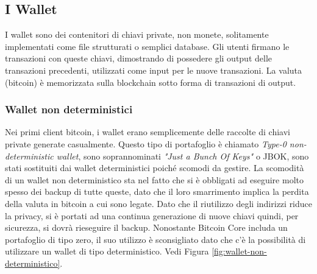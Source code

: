 \subsection*{I Wallet}
I wallet sono dei contenitori di chiavi private, non monete, solitamente implementati come file strutturati o semplici database. Gli utenti firmano le transazioni con queste chiavi, dimostrando di possedere gli output delle transazioni precedenti, utilizzati come input per le nuove transazioni. La valuta (bitcoin) è memorizzata sulla blockchain sotto forma di transazioni di output.
\subsubsection{Wallet non deterministici}
Nei primi client bitcoin, i wallet erano semplicemente delle raccolte di chiavi private generate casualmente. Questo tipo di portafoglio è chiamato \textit{Type-0 non-deterministic wallet}, sono soprannominati \textit{"Just a Bunch Of Keys"} o JBOK, sono stati sostituiti dai wallet deterministici poiché scomodi da gestire. La scomodità di un wallet non deterministico sta nel fatto che si è obbligati ad eseguire molto spesso dei backup di tutte queste, dato che il loro smarrimento implica la perdita della valuta in bitcoin a cui sono legate. Dato che il riutilizzo degli indirizzi riduce la privacy, si è portati ad una continua generazione di nuove chiavi quindi, per sicurezza, si dovrà rieseguire il backup. Nonostante Bitcoin Core includa un portafoglio di tipo zero, il suo utilizzo è sconsigliato dato che c'è la possibilità di utilizzare un wallet di tipo deterministico. Vedi Figura \ref*{fig:wallet-non-deterministico}.

